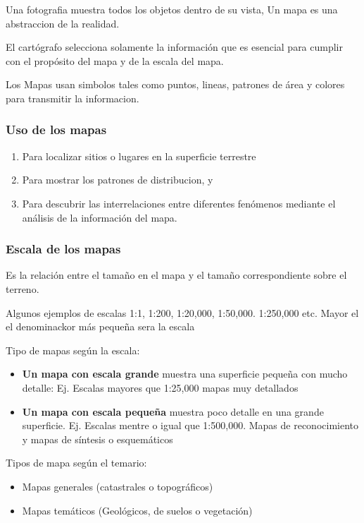 Una fotografia muestra todos los objetos dentro de su vista, Un mapa es una abstraccion de la realidad.

El cartógrafo selecciona solamente la información que es esencial para cumplir con el propósito del mapa y de la escala del mapa.

Los Mapas usan simbolos tales como puntos, lineas, patrones de área y colores para transmitir la informacion.

\subsubsection{Uso de los mapas}
\begin{enumerate}
    \item Para localizar sitios o lugares en la superficie terrestre
    \item Para mostrar los patrones de distribucion, y 
    \item Para descubrir las interrelaciones entre diferentes fenómenos mediante el análisis de la información del mapa.
\end{enumerate}

\subsubsection{Escala de los mapas}
\begin{definition}[Escala]
    Es la relación entre el tamaño en el mapa y el tamaño correspondiente sobre el terreno.
\end{definition}

Algunos ejemplos de escalas 1:1, 1:200, 1:20,000, 1:50,000. 1:250,000 etc. Mayor el el denominackor más pequeña sera la escala

Tipo de mapas según la escala:
\begin{itemize}
    \item \textbf{Un mapa con escala grande} muestra una superficie pequeña con mucho detalle: Ej. Escalas mayores que 1:25,000 mapas muy detallados
    \item \textbf{Un mapa con escala pequeña} muestra poco detalle en una grande superficie. Ej. Escalas mentre o igual que 1:500,000. Mapas de reconocimiento y mapas de síntesis o esquemáticos
\end{itemize}

Tipos de mapa según el temario:
\begin{itemize}
    \item Mapas generales (catastrales o topográficos)
    \item Mapas temáticos (Geológicos, de suelos o vegetación)
\end{itemize}


